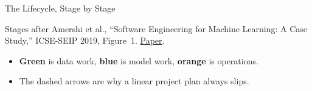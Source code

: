 \begin{frame}{The Lifecycle, Stage by Stage}
{}

    \vspace{0.5em}
    {\scriptsize Stages after Amershi et al., ``Software Engineering for Machine Learning: A Case Study,''
    ICSE-SEIP 2019, Figure~1.
    \href{https://www.microsoft.com/en-us/research/publication/software-engineering-for-machine-learning-a-case-study/}{Paper}.}

    \vspace{0.5em}
    \begin{itemize}
        \item \textbf{Green} is data work, \textbf{blue} is model work, \textbf{orange} is operations.
        \item The dashed arrows are why a linear project plan always slips.
    \end{itemize}

\end{frame}
